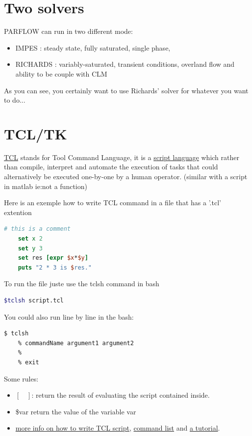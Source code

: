 \documentclass[11pt,a4paper]{report}
\begin{document}
\section{Two solvers}
PARFLOW can run in two different mode:
\begin{itemize}
\item IMPES : steady state, fully saturated, single phase, 
\item RICHARDS : variably-saturated, transient conditions, overland flow and ability to be couple with CLM
\end{itemize}
As you can see, you certainly want to use Richards' solver for whatever you want to do...

\section{TCL/TK}

\href{https://en.wikipedia.org/wiki/Tcl}{TCL} stands for Tool Command Language, it is a \href{https://en.wikipedia.org/wiki/Scripting_language}{script language} which rather than compile, interpret and automate the execution of tasks that could alternatively be executed one-by-one by a human operator. (similar with a script in matlab ie:not a function)

Here is an exemple how to write TCL command in a file that has a '.tcl' extention
\begin{lstlisting}[language=TCL]
    # this is a comment
    set x 2
    set y 3
    set res [expr $x*$y]
    puts "2 * 3 is $res."
\end{lstlisting}

To run the file juste use the tclsh command in bash
\begin{lstlisting}[language=bash]
    $tclsh script.tcl 
\end{lstlisting}

You could also run line by line in the bash:
\begin{lstlisting}[language=bash]
    $ tclsh
    % commandName argument1 argument2
    % 
    % exit
\end{lstlisting}

Some rules:
\begin{itemize}
\item $[\quad]$: return the result of evaluating the script contained inside.
\item \$var return the value of the variable var
\item \href{http://www.tcl.tk/man/tcl/TclCmd/Tcl.htm}{more info on how to write TCL script}, \href{http://www.tcl.tk/man/tcl/TclCmd/contents.htm}{command list} and \href{http://www.tcl.tk/man/tcl8.5/tutorial/tcltutorial.html}{a tutorial}.
\end{itemize}
\end{document}
